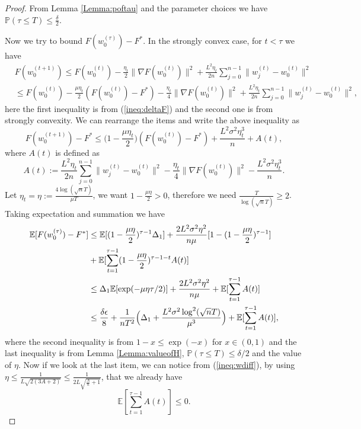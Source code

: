 \documentclass{article} %
\theoremstyle{plain}
\theoremstyle{definition}
\theoremstyle{remark}
\begin{document}
\begin{proof} 

    From Lemma \ref{Lemma:poftau} and the parameter choices we have $\mathbb{P}(\tau\leq T)\leq \frac{\delta}{2}.$

    Now we try to bound $F(w^{(\tau)}_0)-F^*$. In the strongly convex case, for $t<\tau$ we have 
    \begin{align*}
        &F(w^{(t+1)}_0) \leq F(w^{(t)}_0)-\frac{\eta_t}{2}\|\nabla F(w^{(t)}_0)\|^2+\frac{L^2\eta_t}{2n}\sum_{j=0}^{n-1}\|w^{(t)}_j-w^{(t)}_0\|^2 \\
        & \leq F(w^{(t)}_0)-\frac{\mu\eta_t}{2} (F(w^{(t)}_0)-F^*)-\frac{\eta_t}{4}\|\nabla F(w^{(t)}_0)\|^2+\frac{L^2\eta_t}{2n}\sum_{j=0}^{n-1}\|w^{(t)}_j-w^{(t)}_0\|^2,
    \end{align*}
    here the first inequality is from (\ref{ineq:deltaF}) and the second one is from strongly convexity. We can rearrange the items and write the above inequality as 
    \begin{equation}
        F(w^{(t+1)}_0)-F^* \leq \Big(1-\frac{\mu\eta_t}{2}\Big)(F(w^{(t)}_0)-F^*)+\frac{L^2\sigma^2\eta_t^3}{n}+A(t),
    \end{equation}
    where $A(t)$ is defined as
    \begin{equation}
        A(t):= \frac{L^2\eta_t}{2n}\sum_{j=0}^{n-1}\|w^{(t)}_j-w^{(t)}_0\|^2-\frac{\eta_t}{4}\|\nabla F(w^{(t)}_0)\|^2-\frac{L^2\sigma^2\eta_t^3}{n}.
    \end{equation}
   Let $\eta_t=\eta:=\frac{4\log(\sqrt{n}T)}{\mu T}$, we want $1-\frac{\mu\eta}{2}>0$, therefore we need $\frac{T}{\log(\sqrt{n}T)}\geq 2$. Taking expectation and summation we have
    \begin{align}
        \mathbb{E}[F(w^{(\tau)}_0)-F^*] & \leq \mathbb{E}[(1-\frac{\mu\eta}{2})^{\tau-1}\Delta_1]+\frac{2L^2\sigma^2\eta^2}{n\mu}[1-(1-\frac{\mu\eta}{2})^{\tau-1}] \notag\\
        &+\mathbb{E}[\sum_{t=1}^{\tau-1}(1-\frac{\mu\eta}{2})^{\tau-1-t}A(t)]\notag \\
        &\leq \Delta_1\mathbb{E}[\exp(-\mu\eta \tau/2)] +\frac{2L^2\sigma^2\eta^2}{n\mu}+\mathbb{E}[\sum_{t=1}^{\tau-1}A(t)]\notag\\
        &\leq \frac{\delta\epsilon}{8}+\frac{1}{nT^2}\Big(\Delta_1+\frac{L^2\sigma^2\log^2(\sqrt{n}T)}{\mu^3}\Big)+\mathbb{E}[\sum_{t=1}^{\tau-1}A(t)],\notag
    \end{align}
    where the second inequality is from $1-x\leq \exp(-x)$ for $x\in(0,1)$ and the last inequality is from Lemma \ref{Lemma:valueofH}, $\mathbb{P}(\tau\leq T)\leq \delta/2$ and the value of $\eta$. Now if we look at the last item, we can notice from (\ref{ineq:wdiff}), by using $\eta\leq \frac{1}{L\sqrt{2(3A+2)}}\leq\frac{1}{2L\sqrt{\frac{A}{n}+1}}$, that we already have $$\mathbb{E}[\sum_{t=1}^{\tau-1}A(t)]\leq 0.$$


\end{proof}
\end{document}
